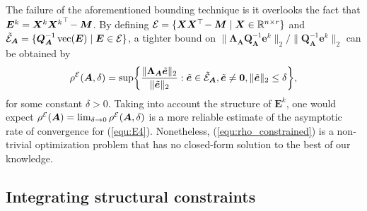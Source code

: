 \documentclass{article}
\def\E{{\cal E}}
\def\R{{\mathbb R}}
\newcommand{\hlnew}[1]{{#1}}
\newcommand{\norm}[1]{\|#1\|} %
\DeclareMathOperator*{\vect}{vec}
\newcommand{\topnew}{\top \hspace{-0.05cm}}
\begin{document}
The failure of the aforementioned bounding technique is it overlooks the fact that $\bm E^k = \bm X^k {\bm X^k}^\topnew - \bm M$. By defining $\E = \{ \bm X \bm X^\topnew - \bm M \mid \bm X \in \R^{n \times r} \}$ and $\tilde{\E}_{\bm A} = \{ \bm Q^{-1}_{\bm A} \vect(\bm E) \mid \bm E \in \E \}$,
a tighter bound \hlnew{on $\norm{\bm \Lambda_{\bm A} \bm Q_{\bm A}^{-1} \bm e^k}_2 / \norm{\bm Q_{\bm A}^{-1} \bm e^k}_2$} can be obtained by
\begin{align} \label{equ:rho_constrained}
    \rho^{\E}(\bm A,\delta) = \sup \biggl\{ \frac{\norm{\bm \Lambda_{\bm A} \tilde{\bm e}}_2}{\norm{\tilde{\bm e}}_2} : \tilde{\bm e} \in \tilde{\E}_{\bm A}, \tilde{\bm e} \neq \bm 0, \norm{\tilde{\bm e}}_2 \leq \delta \biggr\} ,
\end{align}
for some constant $\delta > 0$.
Taking into account the structure of $\bm E^k$, one would expect $\rho^\E (\bm A) = \lim_{\delta \to 0} \rho^{\E}(\bm A,\delta)$ is a more reliable estimate of the asymptotic rate of convergence for (\ref{equ:E4}). Nonetheless, (\ref{equ:rho_constrained}) is a non-trivial optimization problem that has no closed-form solution to the best of our knowledge.









\subsection{Integrating structural constraints}%
\end{document}
